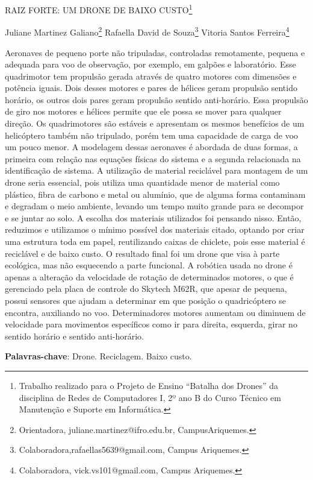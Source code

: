 \documentclass[article,12pt,onesidea,4paper,english,brazil]{abntex2}
\begin{document}
	
	
	\frenchspacing 
	
	\begin{center}
		\LARGE RAIZ FORTE: UM DRONE DE BAIXO CUSTO\footnote{Trabalho realizado para o Projeto de Ensino “Batalha dos Drones” da disciplina de Redes de Computadores I, 2º ano B do Curso Técnico em Manutenção e Suporte em Informática.}
		
		\normalsize
		Juliane Martinez Galiano\footnote{Orientadora, juliane.martinez@ifro.edu.br, CampusAriquemes.} 
		Rafaella David de Souza\footnote{Colaboradora,rafaellas5639@gmail.com, Campus Ariquemes.} 
		Vitoria Santos Ferreira\footnote{Colaboradora, vick.vs101@gmail.com, Campus Ariquemes.} 
	\end{center}
	
	\noindent Aeronaves de pequeno porte não tripuladas, controladas remotamente, pequena e adequada para voo de observação, por exemplo, em galpões e laboratório. Esse quadrimotor tem propulsão gerada através de quatro motores com dimensões e potência iguais. Dois desses motores e pares de hélices geram propulsão sentido horário, os outros dois pares geram propulsão sentido anti-horário. Essa propulsão de giro nos motores e hélices permite que ele possa se mover para qualquer direção. Os quadrimotores são estáveis e apresentam os mesmos benefícios de um helicóptero também não tripulado, porém tem uma capacidade de carga de voo um pouco menor. A modelagem dessas aeronaves é abordada de duas formas, a primeira com relação nas equações físicas do sistema e a segunda relacionada na identificação de sistema. A utilização de material reciclável para montagem de um drone seria essencial, pois utiliza uma quantidade menor de material como plástico, fibra de carbono e metal ou alumínio, que de alguma forma contaminam e degradam o meio ambiente, levando um tempo muito grande para se decompor e se juntar ao solo. A escolha dos materiais utilizados foi pensando nisso. Então, reduzimos e utilizamos o mínimo possível dos materiais citado, optando por criar uma estrutura toda em papel, reutilizando caixas de chiclete, pois esse material é reciclável e de baixo custo. O resultado final foi um drone que visa à parte ecológica, mas não esquecendo a parte funcional. A robótica usada no drone é apenas a alteração da velocidade de rotação de determinados motores, o que é gerenciado pela placa de controle do Skytech M62R, que apesar de pequena, possui sensores que ajudam a determinar em que posição o quadricóptero se encontra, auxiliando no voo. Determinadores motores aumentam ou diminuem de velocidade para movimentos específicos como ir para direita, esquerda, girar no sentido horário e sentido anti-horário.
	
	\vspace{\onelineskip}
	
	\noindent
	\textbf{Palavras-chave}: Drone. Reciclagem. Baixo custo.
	
\end{document}
